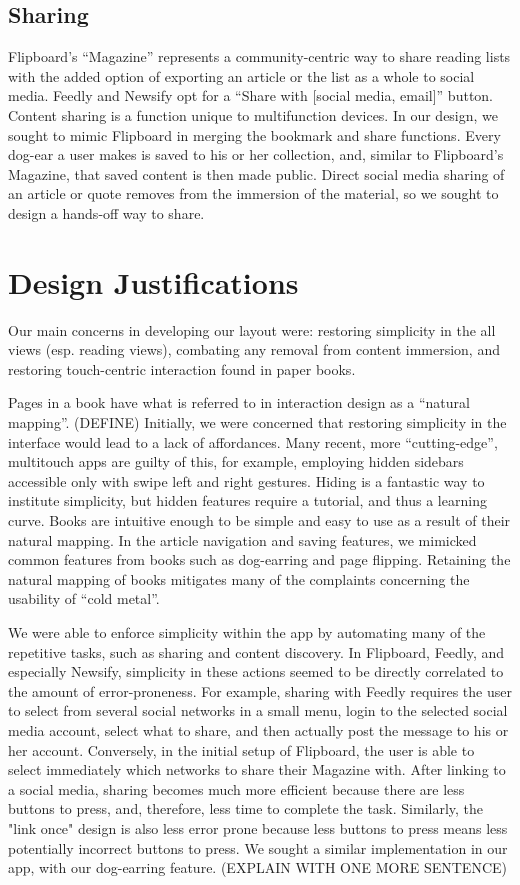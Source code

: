 \documentclass[11pt, oneside]{article}   	%
\begin{document}
\subsection{Sharing}
Flipboard's ``Magazine'' represents a community-centric way to share reading lists with the added option of exporting an article or the list as a whole to social media. Feedly and Newsify opt for a ``Share with [social media, email]'' button. Content sharing is a function unique to multifunction devices. In our design, we sought to mimic Flipboard in merging the bookmark and share functions. Every dog-ear a user makes is saved to his or her collection, and, similar to Flipboard's Magazine, that saved content is then made public. Direct social media sharing of an article or quote removes from the immersion of the material, so we sought to design a hands-off way to share.

\section{Design Justifications}
Our main concerns in developing our layout were: restoring simplicity in the all views (esp. reading views), combating any removal from content immersion, and restoring touch-centric interaction found in paper books.

Pages in a book have what is referred to in interaction design as a ``natural mapping''. (DEFINE) Initially, we were concerned that restoring simplicity in the interface would lead to a lack of affordances. Many recent, more ``cutting-edge'', multitouch apps are guilty of this, for example, employing hidden sidebars accessible only with swipe left and right gestures. Hiding is a fantastic way to institute simplicity, but hidden features require a tutorial, and thus a learning curve. Books are intuitive enough to be simple and easy to use as a result of their natural mapping. In the article navigation and saving features, we mimicked common features from books such as dog-earring and page flipping. Retaining the natural mapping of books mitigates many of the complaints concerning the usability of ``cold metal''.

We were able to enforce simplicity within the app by automating many of the repetitive tasks, such as sharing and content discovery. In Flipboard, Feedly, and especially Newsify, simplicity in these actions seemed to be directly correlated to the amount of error-proneness. For example, sharing with Feedly requires the user to select from several social networks in a small menu, login to the selected social media account, select what to share, and then actually post the message to his or her account. Conversely, in the initial setup of Flipboard, the user is able to select immediately which networks to share their Magazine with. After linking to a social media, sharing becomes much more efficient because there are less buttons to press, and, therefore, less time to complete the task. Similarly, the "link once" design is also less error prone because less buttons to press means less potentially incorrect buttons to press. We sought a similar implementation in our app, with our dog-earring feature. (EXPLAIN WITH ONE MORE SENTENCE)
\end{document}
